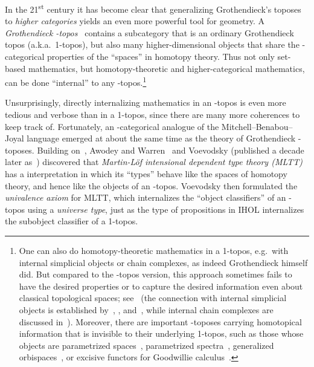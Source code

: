 In the 21\textsuperscript{st} century it has become clear that generalizing Grothendieck's toposes to \emph{higher categories} yields an even more powerful tool for geometry.
A \emph{Grothendieck \io-topos}~\cite{tv:hag-i,rezk:homotopy-toposes,lurie:higher-topoi} contains a subcategory that is an ordinary Grothendieck topos (a.k.a.\ 1-topos), but also many higher-dimensional objects that share the \io-categorical properties of the ``spaces'' in homotopy theory.
Thus not only set-based mathematics, but homotopy-theoretic and higher-categorical mathematics, can be done ``internal'' to any \io-topos.\footnote{One can also do homotopy-theoretic mathematics in a 1-topos, e.g.\ with internal simplicial objects or chain complexes, as indeed Grothendieck himself did.
  But compared to the \io-topos version, this approach sometimes fails to have the desired properties or to capture the desired information even about classical topological spaces; see~\cite[.4]{lurie:higher-topoi} (the connection with internal simplicial objects is established by~\cite[Proposition 6.5.2.14]{lurie:higher-topoi}, \cite[Theorem 5]{jardine:fields-spre}, and~\cite{beke:sheafifiable,jardine:bool-loc}, while internal chain complexes are discussed in~\cite[Remark 6.5.4.3]{lurie:higher-topoi}).
  Moreover, there are important \io-toposes carrying homotopical information that is invisible to their underlying 1-topos, such as those whose objects are parametrized spaces~\cite{maysig:pht,abghr:thom-oocat}, parametrized spectra~\cite{joyal:logoi,hoyois:topoi-param}, generalized orbispaces~\cite{rezk:global-cohesion}, or excisive functors for Goodwillie calculus~\cite{abfj:goodwillie-htt}.}

Unsurprisingly, directly internalizing mathematics in an \io-topos is even more tedious and verbose than in a 1-topos, since there are many more coherences to keep track of.
Fortunately, an \io-categorical analogue of the Mitchell--Benabou--Joyal language emerged at about the same time as the theory of Grothendieck \io-toposes.
Building on~\cite{hs:gpd-typethy}, Awodey and Warren~\cite{aw:htpy-idtype} and Voevodsky (published a decade later as~\cite{klv:ssetmodel}) discovered that \emph{Martin-L\"{o}f intensional dependent type theory (MLTT)}~\cite{martinlof:itt,martinlof:itt-pred} has a interpretation in which its ``types'' behave like the spaces of homotopy theory, and hence like the objects of an \io-topos.
Voevodsky then formulated the \emph{univalence axiom} for MLTT, which internalizes the ``object classifiers'' of an \io-topos using a \emph{universe type}, just as the type of propositions in IHOL internalizes the subobject classifier of a 1-topos.

